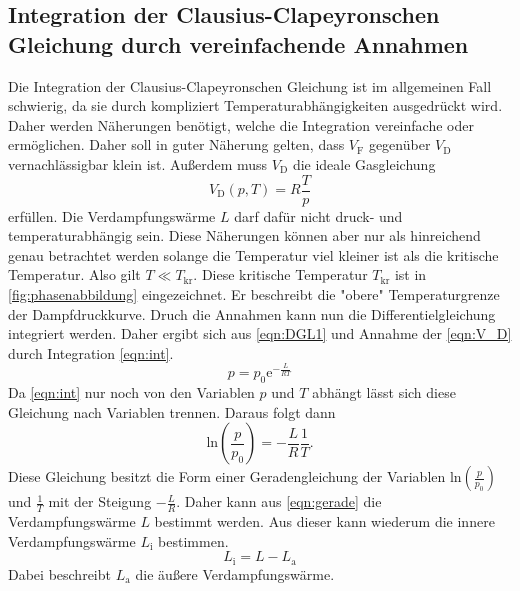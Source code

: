 \subsection{Integration der Clausius-Clapeyronschen Gleichung durch vereinfachende Annahmen}
\label{subsec:T_int}
Die Integration der Clausius-Clapeyronschen Gleichung ist im allgemeinen Fall schwierig, da sie durch kompliziert Temperaturabhängigkeiten ausgedrückt wird. Daher werden Näherungen benötigt, welche
die Integration vereinfache oder ermöglichen. Daher soll in guter Näherung gelten, dass $V_\text{F}$ gegenüber $V_\text{D}$ vernachlässigbar klein ist. Außerdem muss $V_\text{D}$ die ideale Gasgleichung
\begin{equation}
    \label{eqn:V_D}
    V_\text{D}(p,T) = R\frac{T}{p}
\end{equation} 
erfüllen. Die Verdampfungswärme $L$ darf dafür nicht druck- und temperaturabhängig sein. Diese Näherungen können aber nur als hinreichend genau betrachtet werden solange die Temperatur
viel kleiner ist als die kritische Temperatur. Also gilt $T \ll T_\text{kr}$. Diese kritische Temperatur $T_\text{kr}$ ist in \autoref{fig:phasenabbildung} eingezeichnet. Er beschreibt die "obere"
Temperaturgrenze der Dampfdruckkurve. Druch die Annahmen kann nun die Differentielgleichung integriert werden. Daher ergibt sich aus \autoref{eqn:DGL1} und Annahme der \autoref{eqn:V_D} durch Integration
\autoref{eqn:int}.
\begin{equation}
    \label{eqn:int}
    p = p_0\text{e}^{-\frac{L}{RT}}
\end{equation}
Da \autoref{eqn:int} nur noch von den Variablen $p$ und $T$ abhängt lässt sich diese Gleichung nach Variablen trennen. Daraus folgt dann 
\begin{equation}
    \label{eqn:gerade}
    \text{ln}\left(\frac{p}{p_0}\right) = -\frac{L}{R}\frac{1}{T}.
\end{equation}
Diese Gleichung besitzt die Form einer Geradengleichung der Variablen $\text{ln}\left(\frac{p}{p_0}\right)$ und $\frac{1}{T}$ mit der Steigung $-\frac{L}{R}$. Daher kann aus \autoref{eqn:gerade} die 
Verdampfungswärme $L$ bestimmt werden. Aus dieser kann wiederum die innere Verdampfungswärme $L_\text{i}$ bestimmen.
\begin{equation}
    \label{eqn:LI}
    L_\text{i} = L - L_\text{a}
\end{equation}
Dabei beschreibt $L_\text{a}$ die äußere Verdampfungswärme.